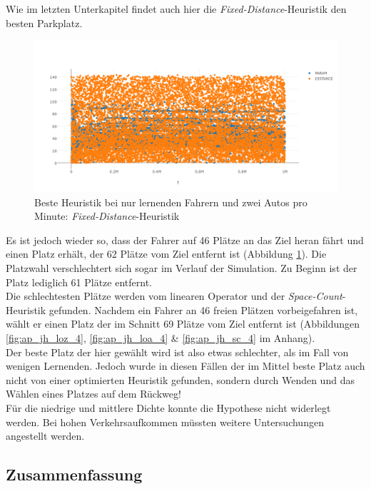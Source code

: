Wie im letzten Unterkapitel findet auch hier die \emph{Fixed-Distance}-Heuristik den besten Parkplatz.
\begin{figure}
	\includegraphics[width=\textwidth]{analyse/JustHeuristik/4pm/fixed4just.png}
	\caption{Beste Heuristik bei nur lernenden Fahrern und zwei Autos pro Minute: \emph{Fixed-Distance}-Heuristik} \label{fig:res_jh_4pm_best}
\end{figure}
Es ist jedoch wieder so, dass der Fahrer auf 46 Plätze an das Ziel heran fährt und einen Platz erhält, der 62 Plätze vom Ziel entfernt ist (Abbildung \ref{fig:res_jh_4pm_best}). Die Platzwahl verschlechtert sich sogar im Verlauf der Simulation. Zu Beginn ist der Platz lediglich 61 Plätze entfernt.\\
Die schlechtesten Plätze werden vom linearen Operator und der \emph{Space-Count}-Heuristik gefunden. Nachdem ein Fahrer an 46 freien Plätzen vorbeigefahren ist, wählt er einen Platz der im Schnitt 69 Plätze vom Ziel entfernt ist (Abbildungen \ref{fig:ap_jh_loz_4}, \ref{fig:ap_jh_loa_4} \& \ref{fig:ap_jh_sc_4} im Anhang).\\

Der beste Platz der hier gewählt wird ist also etwas schlechter, als im Fall von wenigen Lernenden. Jedoch wurde in diesen Fällen der im Mittel beste Platz auch nicht von einer optimierten Heuristik gefunden, sondern durch Wenden und das Wählen eines Platzes auf dem Rückweg!\\
Für die niedrige und mittlere Dichte konnte die Hypothese nicht widerlegt werden. Bei hohen Verkehrsaufkommen müssten weitere Untersuchungen angestellt werden.

\subsection{Zusammenfassung}

